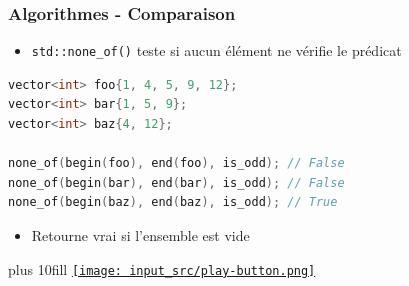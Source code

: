 \documentclass[C++.tex]{subfiles}
\begin{document}
\begin{frame}[fragile]
	\frametitle{Algorithmes - Comparaison}
	\begin{itemize}
		\item \lstinline|std::none_of()| teste si aucun élément ne vérifie le prédicat
	\end{itemize}

	\begin{lstlisting}[language=C++]
vector<int> foo{1, 4, 5, 9, 12};
vector<int> bar{1, 5, 9};
vector<int> baz{4, 12};

none_of(begin(foo), end(foo), is_odd); // False
none_of(begin(bar), end(bar), is_odd); // False
none_of(begin(baz), end(baz), is_odd); // True\end{lstlisting}

	\begin{itemize}
		\item Retourne vrai si l'ensemble est vide
	\end{itemize}

	\vskip 10mm plus 10fill
	\hfill
	\href{https://godbolt.org/#z:OYLghAFBqd5QCxAYwPYBMCmBRdBLAF1QCcAaPECAMzwBtMA7AQwFtMQByARg9KtQYEAysib0QXACx8BBAKoBnTAAUAHpwAMvAFYTStJg1DIApACYAQuYukl9ZATwDKjdAGFUtAK4sGe1wAyeAyYAHI%2BAEaYxCAAbADMpAAOqAqETgwe3r56KWmOAkEh4SxRMQm2mPYFDEIETMQEWT5%2BXJXVGXUNBEVhkdFxiQr1jc05bcPdvSVlgwCUtqhexMjsHObxwcjeWADUJvFuTsPEmKwH2CYaAIIbWzuY%2B4cAbpgOJBdXt2abDNteewObjEwBIhAQLE%2BNy%2BXjSRl2w3QIBAUWAwQOVhusOCwARBCRIFcGK%2BX0mjmQuwiqE8uzwCgA%2Bhh0BBggRaXMSQB2THXXa7U4EZYMXYs8wAVjMHPiABEDtKuMToZzZdCbqzdiwmMEIBylTy%2BSZuV8%2BXzEcjXu9iEDWRddvxUIaLG1dtJdmLSLsAJwerhmQ2y%2BL6k1mlBLNlAoF4glUzxiJIIJhPNyRkNiWiMqgQVHa%2B0LXauajUvN0xnodBzJORsDrMVuBjVxW8/bKkk3A1GtvB/Hmt5EK2HG3xbB26mO53ur3%2BxsmqPItBecOHFPdlHUgy0eOJiOHWcgNMZrOYNEMQuoPMF3MektMivbty7Bu1%2BvrQPG5sq26dx1v00ri1961BFte1HVdX0p1fTtfwJedF2THcQxjddN0rBCV33VBM2zE9L3zBhmVw68y1vJcd0fOsG0gpsp1VT86PbINoJ7S1AIIYDR25Z1XQnb1dnAlsqJnENYNQ%2B9ELXOME1E3dDAATwPbDT3PfClKvBkb2k8jn2nd9W2ojsmyYkB/w%2BAcgKHEcHU4j0eIgxjdxEu9dyQySt1IsT0IYeTMMPY9VLwgiizU0ty00msKJfIMaPo5t7JDEz%2ByOczhxA7kwL9AS4pXRz3OciSNykpzUy8hSjxzIKAv8ojQqcrTKKiltaL0hif13BLWPYqynQ9biPV4/iAyymCw2k8TYwKtz4I8gkGAETBSr83CLwq6qSKmh9wu0wTdNolqoLa3tTKStiLNS7q3T6uzWuEkaipXFyJtGldZpCBbyrPD1lo%2B2l1OIsKTCfeq32i4GDKEv9DsSwcUo4ix0qu/aboXJ7o3ylC7pmua3pwiqvuLX6atyurItBj9oo4BZaE4MVeD8DgtFIVBOGTSxrARJYVkeDYeFIAhNAphYAGsQDFDR9E4SRaf5xnOF4BQQDFvn6Yp0g4FgJBMFUN4FxIchKAaYAFGUQwqiEBBUAAdzpnm0BYJI6CYGpjZCWgzctumGdt%2B36BiYAuF9UgvboaIAHkFzdq3pc1t5rmIQ3ZdIaPkDqfA6d4fhBBEMR2CkGRBEUFR1GV0hdDaAwjBQaxrH0PAInl2BmDYVdUgIUhXhibhORpuYFlQJIanljgAFpETlUxWcsf25Y51Y9ERYJndN83I%2B4XgCFONYeYt4gmCSfnKepqXi6ZjhsC15AdeIXZVAADliIfYkkXZgGQCl/YAOjMEUWasSwPVwQgJB9g/C4HMNe%2B8FgIDOFgGIOpSDC1FuLDgktSAe14CfOWCteYQKQWYI%2BDMMHYOVj3Nu0Q0jOEkEAA%3D}{\texttt{[image: input\_src/play-button.png]}}
\end{frame}
\end{document}

